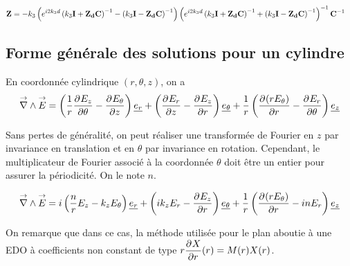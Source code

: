 \begin{align}
    \mat{Z}
    &=-k_3\left( e^{i2 k_3 d} \left(k_3\mat{I} + \mat{Z_d}\mat{C}\right)^{-1} -  \left(k_3\mat{I} - \mat{Z_d}\mat{C}\right)^{-1} \right)\left( e^{i2 k_3 d} \left(k_3\mat{I} + \mat{Z_d}\mat{C}\right)^{-1} + \left(k_3\mat{I} - \mat{Z_d}\mat{C}\right)^{-1} \right)^{-1}\mat{C}^{-1}
\end{align}





\subsection{Forme générale des solutions pour un cylindre}

\newcommand{\mr}{r}
\newcommand{\mt}{\theta}
\newcommand{\mz}{z}

\begin{figure}[htpb]
    \centering
    \begin{tikzpicture}
        
    \end{tikzpicture}
\end{figure}

En coordonnée cylindrique $(r,\theta,z)$, on a
\begin{equation}
    \vrot \vE = \left(\frac{1}{r}\ddr{\theta}{E_z} - \ddr{z}{E_\theta}\right)\v{e_r} + 
    \left(\ddr{z}{E_r} - \ddr{r}{E_z}\right)\v{e_\theta} +
    \frac{1}{r}\left(\ddr{r}{(rE_\theta)}-\ddr{\theta}{E_r}\right)\v{e_z}
\end{equation}

Sans pertes de généralité, on peut réaliser une transformée de Fourier en $z$ par invariance en translation et en $\theta$ par invariance en rotation. Cependant, le multiplicateur de Fourier associé à la coordonnée $\theta$ doit être un entier pour assurer la périodicité. On le note $n$.

\begin{equation}
    \vrot \vE = i\left(\frac{n}{r}E_z - k_zE_\theta\right)\v{e_r} + 
    \left(ik_zE_r - \ddr{r}{E_z}\right)\v{e_\theta} +
    \frac{1}{r}\left(\ddr{r}{(rE_\theta)}-inE_r\right)\v{e_z}
\end{equation}

On remarque que dans ce cas, la méthode utilisée pour le plan aboutie à une EDO à coefficients non constant de type $r\ddr{r}{X}(r) = M(r)X(r)$.



